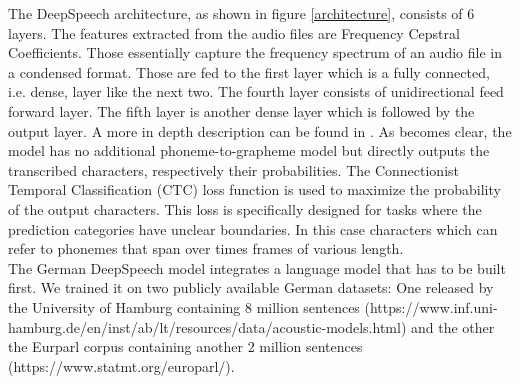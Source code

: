 The DeepSpeech architecture, as shown in figure \ref{architecture}, consists of 6 layers. The features extracted from the audio files are Frequency Cepstral Coefficients. Those essentially capture the frequency spectrum of an audio file in a condensed format. Those are fed to the first layer which is a fully connected, i.e. dense, layer like the next two. The fourth layer consists of unidirectional feed forward layer. The fifth layer is another dense layer which is followed by the output layer. A more in depth description can be found in \citet{Agarwal2019GermanES}. As becomes clear, the model has no additional phoneme-to-grapheme model but directly outputs the transcribed characters, respectively their probabilities. The Connectionist Temporal Classification (CTC) loss function is used to maximize the probability of the output characters. This loss is specifically designed for tasks where the prediction categories have unclear boundaries. In this case characters which can refer to phonemes that span over times frames of various length. 
\\
The German DeepSpeech model integrates a language model that has to be built first. We trained it on two publicly available German datasets: One released by the University of Hamburg containing 8 million sentences (https://www.inf.uni-hamburg.de/en/inst/ab/lt/resources/data/acoustic-models.html) and the other the Eurparl corpus containing another 2 million sentences (https://www.statmt.org/europarl/).  